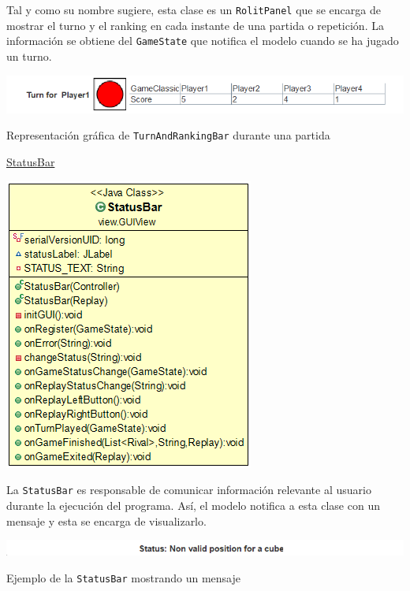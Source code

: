 \documentclass[12pt,a4paper,openright]{book}
\theoremstyle{break}
\begin{document}
Tal y como su nombre sugiere, esta clase es un \texttt{RolitPanel} que se encarga de mostrar el turno y el ranking en cada instante de una partida o repetición. La información se obtiene del \texttt{GameState} que notifica el modelo cuando se ha jugado un turno.


\begin{center}
\includegraphics[scale=0.8]{turnranking-pic.png}

Representación gráfica de \texttt{TurnAndRankingBar} durante una partida
\end{center}

\newpage
\underline{StatusBar}
\begin{center}
\includegraphics[scale=0.60]{statusbar-uml.png}
\end{center}

La \texttt{StatusBar} es responsable de comunicar información relevante al usuario durante la ejecución del programa. Así, el modelo notifica a esta clase con un mensaje y esta se encarga de visualizarlo.

\begin{center}
\includegraphics[scale=0.80]{statusbar-pic.png}

Ejemplo de la \texttt{StatusBar} mostrando un mensaje
\end{center}
\end{document}
